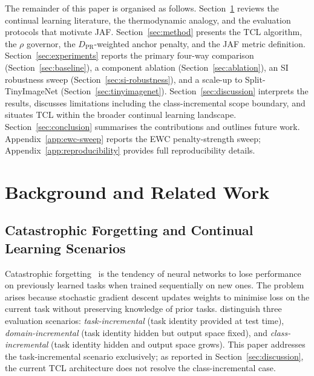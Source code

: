 \documentclass[10pt,a4paper]{article}
\begin{document}
The remainder of this paper is organised as follows.
Section~\ref{sec:background} reviews the continual learning literature,
the thermodynamic analogy, and the evaluation protocols that motivate JAF.
Section~\ref{sec:method} presents the TCL algorithm, the $\rho$ governor,
the $D_\text{PR}$-weighted anchor penalty, and the JAF metric definition.
Section~\ref{sec:experiments} reports the primary four-way comparison
(Section~\ref{sec:baseline}), a component ablation (Section~\ref{sec:ablation}),
an SI robustness sweep (Section~\ref{sec:si-robustness}), and a scale-up to
Split-TinyImageNet (Section~\ref{sec:tinyimagenet}).
Section~\ref{sec:discussion} interprets the results, discusses limitations
including the class-incremental scope boundary, and situates TCL within the
broader continual learning landscape.
Section~\ref{sec:conclusion} summarises the contributions and outlines future work.
Appendix~\ref{app:ewc-sweep} reports the EWC penalty-strength sweep;
Appendix~\ref{app:reproducibility} provides full reproducibility details.



\section{Background and Related Work}
\label{sec:background}

\subsection{Catastrophic Forgetting and Continual Learning Scenarios}

Catastrophic forgetting~\cite{McCloskey1989} is the tendency of neural networks to
lose performance on previously learned tasks when trained sequentially on new ones.
The problem arises because stochastic gradient descent updates weights to minimise
loss on the current task without preserving knowledge of prior tasks.
\citet{vandeVen2019} distinguish three evaluation scenarios: \emph{task-incremental}
(task identity provided at test time), \emph{domain-incremental} (task identity
hidden but output space fixed), and \emph{class-incremental} (task identity hidden
and output space grows).
This paper addresses the task-incremental scenario exclusively; as reported in
Section~\ref{sec:discussion}, the current TCL architecture does not resolve the
class-incremental case.
\end{document}
